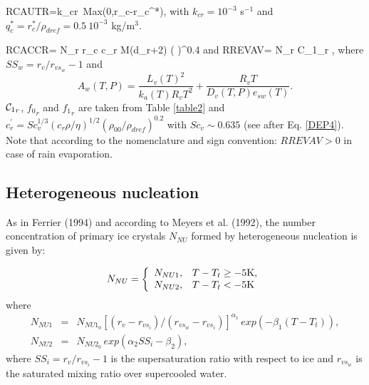 %
\be\label{WARM1}
RCAUTR=k_{cr}\ Max(0,r_c-r_c^*),
\ee
%
\noindent with $k_{cr}=10^{-3}$ s$^{-1}$ and
$q_c^*=r_c^*/\rho_{dref}=0.5\ 10^{-3}$ kg/m$^3$.

%
\be\label{WARM2}
RCACCR= N_r r_c c_r M(d_r+2)
\Big(  \Big)^{0.4}
\ee
%
\noindent and
%
\be\label{WARM3}
RREVAV=\dfrac{4\pi}{\rho}  N_r {{\cal C}_1}_r
    ,
\ee
%
\noindent where $SS_w=r_v/r_{vs_{w}}-1$ and
$$
A_{w}(T,P)=\dfrac{L_v(T)^2}{k_a(T) R_v T^2}+\dfrac{R_v T}{D_v(T,P) e_{sw}(T)}.
$$
\noindent ${{\cal C}_1}_r$, ${{f}_0}_r$ and ${{f}_1}_r$ are taken from
Table \ref{table2} and
$c^\prime_r=Sc_{v}^{1/3}(c_r \rho/\eta)^{1/2}(\rho_{00}/\rho_{dref})^{0.2}$ with
$Sc_{v} \sim 0.635$ (see after Eq. \ref{DEP4}). Note that according to the
nomenclature and sign convention: $RREVAV > 0$ in case of rain evaporation.

%
\subsection{Heterogeneous nucleation}
%
As in Ferrier (1994) and according to Meyers et al. (1992), the number
concentration of primary ice crystals $N_{NU}$ formed by heterogeneous
nucleation is given by:

\begin{equation}\label{NU1}
  N_{NU}=\left\{ \begin{array}{ll}
                   N_{NU1}, & T-T_t \ge -5{\rm K}, \\
                   N_{NU2}, & T-T_t <   -5{\rm K}  \\
                 \end{array}
         \right.
\end{equation}
\noindent where
\begin{eqnarray}\label{NU2}
N_{NU1} &=& N_{NU1_0} \left[ (r_v-r_{vs_{i}})/(r_{vs_{w}}-r_{vs_{i}})
                     \right]^{\alpha_1} \, exp(-\beta_1(T-T_t)), \\
N_{NU2} &=& N_{NU2_0} \, exp(\alpha_2 SS_i - \beta_2),
\end{eqnarray}
\noindent where $SS_i=r_v/r_{vs_{i}}-1$ is the supersaturation ratio with
respect to ice and $r_{vs_{w}}$ is the saturated mixing ratio over supercooled
water.

